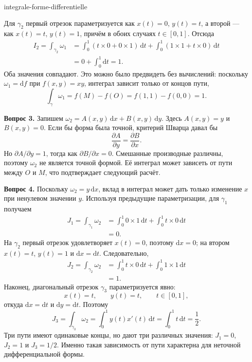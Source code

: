 \begin{exo}{integrale-forme-differentielle}
\begin{solution}
Для $\gamma_2$ первый отрезок параметризуется как $x(t)=0$, $y(t)=t$,
а второй — как $x(t)=t$, $y(t)=1$, причём в обоих случаях $t\in[0,1]$.
Отсюда
\[
\begin{aligned}
I_2
= \int_{\gamma_2}\omega_1
&= \int_0^1\left(t\times 0+0\times 1\right)\,\mathrm{d}t
 + \int_0^1\left(1\times 1+t\times 0\right)\,\mathrm{d}t \\
&= 0+\int_0^1\mathrm{d}t = 1.
\end{aligned}
\]
Оба значения совпадают. Это можно было предвидеть без вычислений: поскольку
$\omega_1=\mathrm{d}f$ при $f(x,y)=xy$, интеграл зависит только от концов пути,
\[
\int_\gamma\omega_1=f(M)-f(O)=f(1,1)-f(0,0)=1.
\]

\textbf{Вопрос 3.} Запишем $\omega_2=A(x,y)\,\mathrm{d}x+B(x,y)\,\mathrm{d}y$.
Здесь $A(x,y)=y$ и $B(x,y)=0$. Если бы форма была точной, критерий Шварца давал бы
\[
\frac{\partial A}{\partial y}=\frac{\partial B}{\partial x}.
\]
Но $\partial A/\partial y=1$, тогда как $\partial B/\partial x=0$.
Смешанные производные различны, поэтому $\omega_2$ не является точной формой.
Её интеграл может зависеть от пути между $O$ и $M$, что подтверждает следующий расчёт.

\textbf{Вопрос 4.} Поскольку $\omega_2=y\,\mathrm{d}x$, вклад в интеграл
может дать только изменение $x$ при ненулевом значении $y$.
Используя предыдущие параметризации, для $\gamma_1$ получаем
\[
\begin{aligned}
J_1
=\int_{\gamma_1}\omega_2
&=\int_0^1 0\times 1\,\mathrm{d}t
  +\int_0^1 t\times 0\,\mathrm{d}t \\
&=0.
\end{aligned}
\]
На $\gamma_2$ первый отрезок удовлетворяет $x(t)=0$, поэтому
$\mathrm{d}x=0$; на втором $x(t)=t$, $y(t)=1$ и
$\mathrm{d}x=\mathrm{d}t$. Следовательно,
\[
\begin{aligned}
J_2
=\int_{\gamma_2}\omega_2
&=\int_0^1 t\times 0\,\mathrm{d}t
  +\int_0^1 1\times 1\,\mathrm{d}t \\
&=1.
\end{aligned}
\]
Наконец, диагональный отрезок $\gamma_3$ параметризуется явно:
\[
x(t)=t,\qquad y(t)=t,\qquad t\in[0,1],
\]
откуда $\mathrm{d}x=\mathrm{d}t$ и $\mathrm{d}y=\mathrm{d}t$. Поэтому
\[
J_3
=\int_{\gamma_3}\omega_2
=\int_0^1 y(t)x'(t)\,\mathrm{d}t
=\int_0^1 t\,\mathrm{d}t
=\frac12.
\]
Три пути имеют одинаковые концы, но дают три различных значения:
$J_1=0$, $J_2=1$ и $J_3=1/2$. Именно такая зависимость от пути характерна
для неточной дифференциальной формы.
\end{solution}
\end{exo}

